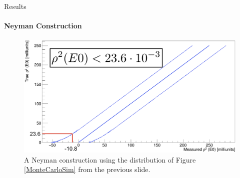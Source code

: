 \documentclass{beamer}
\begin{document}


\begin{frame}{Results}
\framesubtitle{Neyman Construction}
\begin{figure}[!hht]
  \centering
  \includegraphics[width=\textwidth, keepaspectratio]{NeymanAndFinal.png}
  \caption{A Neyman construction using the distribution of Figure \ref{MonteCarloSim} from the previous slide.}
  \label{Neyman}
\end{figure}
\end{frame}



\end{document}
